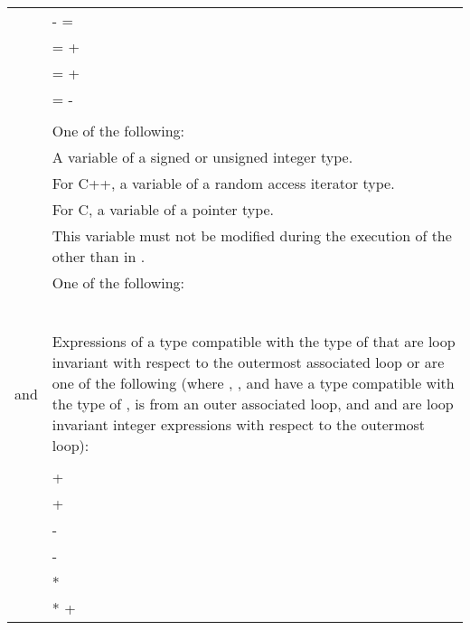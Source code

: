 \begin{ccppspecific}
\begin{supertabular}{ p{0.8in} p{4.5in}}
    & {} {-} = {}\\
    & {} = {} + {}\\
    & {} = {} + {}\\
    & {} = {} - {}\\
    & \\
    {} & One of the following:\\
    & \hspace{1.5em}A variable of a signed or unsigned integer type.\\
    & \hspace{1.5em}For C++, a variable of a random access iterator type.\\
    & \hspace{1.5em}For C, a variable of a pointer type.\\
    & This variable must not be modified during the execution of the {}
    other than in {}. \\
    {} & One of the following:\\
    & {\scode{<}}\\
    & {\scode{<=}}\\
    & {\scode{>}}\\
    & {\scode{>=}}\\
    & {\scode{!=}}\\
    & \\
    {} and {} & Expressions of a type compatible with the
    type of {} that are loop invariant with respect to the outermost
    associated loop or are one of the following (where {},
    {}, and {} have a type compatible with the type of
    {}, {} is {} from an outer associated
    loop, and {} and {} are loop invariant integer
    expressions with respect to the outermost loop): \\
    & {} \\
    & {} + {} \\
    & {} + {} \\
    & {} - {} \\
    & {} - {} \\
    & {} {*} {} \\
    & {} {*} {} + {} \\

\end{supertabular}
\end{ccppspecific}
